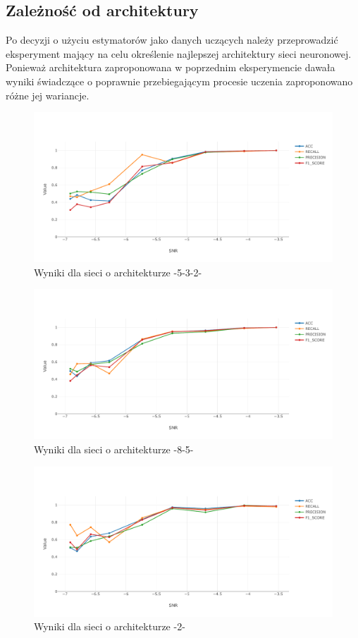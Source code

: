 \documentclass[12pt, a4paper, oneside]{article}
\begin{document}
	\subsection{Zależność od architektury}
	Po decyzji o użyciu estymatorów jako danych uczących należy przeprowadzić eksperyment mający na celu określenie najlepszej architektury sieci neuronowej. Ponieważ architektura zaproponowana w poprzednim eksperymencie dawała wyniki świadczące o poprawnie przebiegającym procesie uczenia zaproponowano różne jej wariancje. 
		\begin{figure}[H]
		\centering
		\includegraphics[width=14cm]{images/nn_small_532.pdf}
		\caption{Wyniki dla sieci o architekturze -5-3-2-}
	\end{figure}
	\begin{figure}[H]
		\centering
		\includegraphics[width=14cm]{images/nn_small_85.pdf}
		\caption{Wyniki dla sieci o architekturze -8-5-}
	\end{figure}
		\begin{figure}[H]
			\centering
			\includegraphics[width=14cm]{images/nn_small_2.pdf}
			\caption{Wyniki dla sieci o architekturze -2-}
		\end{figure}
\end{document}
